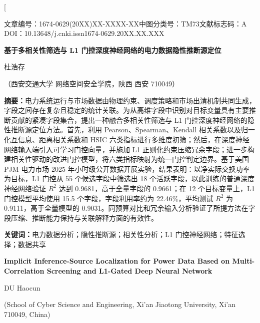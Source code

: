 \documentclass[UTF8,zihao=5,twoside]{ctexart}
\numberwithin{equation}{section}
\newcommand{\articleinfo}{文章编号：1674-0629(20XX)XX-XXXX-XX\quad 中图分类号：TM73\quad 文献标志码：A\\
DOI：10.13648/j.cnki.issn1674-0629.20XX.XX.XXX}
\begin{document}
\twocolumn[

\begin{center}
{\articleinfo}\par\vspace{1.0em}
{\sffamily{}\bfseries 基于多相关性筛选与 L1 门控深度神经网络的电力数据隐性推断源定位}\par\vspace{0.8em}
{杜浩存}\par\vspace{0.4em}
{（西安交通大学 网络空间安全学院，陕西 西安 710049）}\par\vspace{0.8em}
\end{center}

\noindent\textbf{摘要：}电力系统运行与市场数据由物理约束、调度策略和市场出清机制共同生成，字段之间存在复杂且稳定的统计关联。为从高维字段中识别对目标变量具有主要推断贡献的紧凑字段集合，提出一种融合多相关性筛选与 L1 门控深度神经网络的隐性推断源定位方法。首先，利用 Pearson、Spearman、Kendall 相关系数以及归一化互信息、距离相关系数和 HSIC 六类指标进行多维度初筛；然后，在深度神经网络输入端引入可学习门控向量，并施加 L1 正则化约束压缩冗余字段；进一步构建相关性驱动的改进门控模型，将六类指标映射为统一门控判定边界。基于美国 PJM 电力市场 2025 年小时级公开数据开展实验，结果表明：以净实际交换功率为目标，L1 门控从 55 个候选字段中筛选出 18 个活跃字段，以此训练的普通深度神经网络验证 $R^2$ 达到 0.9681，高于全量字段的 0.9661；在 12 个目标变量上，L1 门控模型平均使用 15.5 个字段，字段利用率约为 22.46\%，平均测试 $R^2$ 为 0.9111，高于全量模型的 0.9031。同预算对比和冗余输入分析验证了所提方法在字段压缩、推断能力保持与关联解释方面的有效性。\par
\noindent\textbf{关键词：}电力数据分析；隐性推断源；相关性分析；L1 门控神经网络；特征选择；数据共享\par\vspace{0.8em}

\begin{center}
{\bfseries\large Implicit Inference-Source Localization for Power Data Based on Multi-Correlation Screening and L1-Gated Deep Neural Network}\par\vspace{0.5em}
{DU Haocun}\par\vspace{0.3em}
{\small (School of Cyber Science and Engineering, Xi'an Jiaotong University, Xi'an 710049, China)}\par\vspace{0.5em}
\end{center}
\end{document}
